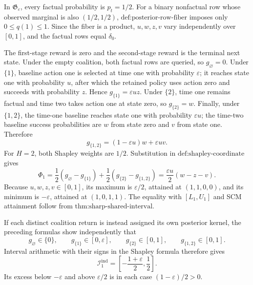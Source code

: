 In \(\mathfrak G_\varepsilon\), every factual probability is \(p_t=1/2\).  For a binary nonfactual row whose observed marginal is also \((1/2,1/2)\), \(\text{def:posterior-row-fiber}\) imposes only \(0\le q(1)\le1\).  Since the fiber is a product, \(u,w,z,v\) vary independently over \([0,1]\), and the factual rows equal \(\delta_0\).

The first-stage reward is zero and the second-stage reward is the terminal next state.  Under the empty coalition, both factual rows are queried, so \(g_\varnothing=0\).  Under \(\{1\}\), baseline action one is selected at time one with probability \(\varepsilon\); it reaches state one with probability \(u\), after which the retained policy uses action zero and succeeds with probability \(z\).  Hence \(g_{\{1\}}=\varepsilon uz\).  Under \(\{2\}\), time one remains factual and time two takes action one at state zero, so \(g_{\{2\}}=w\).  Finally, under \(\{1,2\}\), the time-one baseline reaches state one with probability \(\varepsilon u\); the time-two baseline success probabilities are \(w\) from state zero and \(v\) from state one.  Therefore
\[
 g_{\{1,2\}}=(1-\varepsilon u)w+\varepsilon uv.
\]
For \(H=2\), both Shapley weights are \(1/2\).  Substitution in \(\text{def:shapley-coordinate}\) gives
\[
 \Phi_1=\frac12(g_\varnothing-g_{\{1\}})
       +\frac12(g_{\{2\}}-g_{\{1,2\}})
 =\frac{\varepsilon u}{2}(w-z-v).
\]
Because \(u,w,z,v\in[0,1]\), its maximum is \(\varepsilon/2\), attained at \((1,1,0,0)\), and its minimum is \(-\varepsilon\), attained at \((1,0,1,1)\).  The equality with \([L_1,U_1]\) and SCM attainment follow from \(\text{thm:sharp-shared-interval}\).

If each distinct coalition return is instead assigned its own posterior kernel, the preceding formulas show independently that
\[
 g_\varnothing\in\{0\},\qquad
 g_{\{1\}}\in[0,\varepsilon],\qquad
 g_{\{2\}}\in[0,1],\qquad
 g_{\{1,2\}}\in[0,1].
\]
Interval arithmetic with their signs in the Shapley formula therefore gives
\[
 \mathcal I_1^{\mathrm{ind}}
 =\left[-\frac{1+\varepsilon}{2},\frac12\right].
\]
Its excess below \(-\varepsilon\) and above \(\varepsilon/2\) is in each case \((1-\varepsilon)/2>0\).


